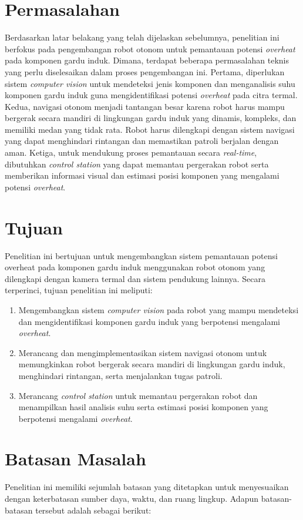 \section{Permasalahan}
Berdasarkan latar belakang yang telah dijelaskan sebelumnya, penelitian ini berfokus pada pengembangan robot otonom untuk pemantauan potensi \emph{overheat} pada komponen gardu induk. Dimana, terdapat beberapa permasalahan teknis yang perlu diselesaikan dalam proses pengembangan ini. Pertama, diperlukan sistem \emph{computer vision} untuk mendeteksi jenis komponen dan menganalisis suhu komponen gardu induk guna mengidentifikasi potensi \emph{overheat} pada citra termal. Kedua, navigasi otonom menjadi tantangan besar karena robot harus mampu bergerak secara mandiri di lingkungan gardu induk yang dinamis, kompleks, dan memiliki medan yang tidak rata. Robot harus dilengkapi dengan sistem navigasi yang dapat menghindari rintangan dan memastikan patroli berjalan dengan aman. Ketiga, untuk mendukung proses pemantauan secara \emph{real-time}, dibutuhkan \emph{control station} yang dapat memantau pergerakan robot serta memberikan informasi visual dan estimasi posisi komponen yang mengalami potensi \emph{overheat}.


\section{Tujuan}
\label{sec:Tujuan}
Penelitian ini bertujuan untuk mengembangkan sistem pemantauan potensi overheat pada komponen gardu induk menggunakan robot otonom yang dilengkapi dengan kamera termal dan sistem pendukung lainnya. Secara terperinci, tujuan penelitian ini meliputi:
\begin{enumerate}
      \item Mengembangkan sistem \emph{computer vision} pada robot yang mampu mendeteksi dan mengidentifikasi komponen gardu induk yang berpotensi mengalami \emph{overheat}.
      \item Merancang dan mengimplementasikan sistem navigasi otonom untuk memungkinkan robot bergerak secara mandiri di lingkungan gardu induk, menghindari rintangan, serta menjalankan tugas patroli.
      \item Merancang \emph{control station} untuk memantau pergerakan robot dan menampilkan hasil analisis suhu serta estimasi posisi komponen yang berpotensi mengalami \emph{overheat}.
\end{enumerate}

\newpage


\section{Batasan Masalah}
Penelitian ini memiliki sejumlah batasan yang ditetapkan untuk menyesuaikan dengan keterbatasan sumber daya, waktu, dan ruang lingkup. Adapun batasan-batasan tersebut adalah sebagai berikut:


